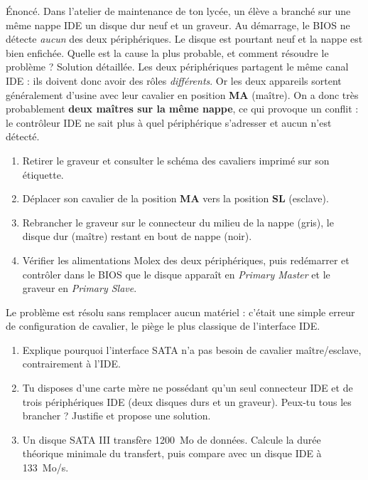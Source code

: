 \documentclass[11pt]{article}
\begin{document}
\begin{exoresolu}
Énoncé. Dans l'atelier de maintenance de ton lycée, un élève a branché sur une même nappe IDE un disque dur neuf et un graveur. Au démarrage, le BIOS ne détecte \emph{aucun} des deux périphériques. Le disque est pourtant neuf et la nappe est bien enfichée. Quelle est la cause la plus probable, et comment résoudre le problème ?
\tcblower
Solution détaillée. Les deux périphériques partagent le même canal IDE : ils doivent donc avoir des rôles \emph{différents}. Or les deux appareils sortent généralement d'usine avec leur cavalier en position \textbf{MA} (maître). On a donc très probablement \textbf{deux maîtres sur la même nappe}, ce qui provoque un conflit : le contrôleur IDE ne sait plus à quel périphérique s'adresser et aucun n'est détecté.
\begin{enumerate}
\item Retirer le graveur et consulter le schéma des cavaliers imprimé sur son étiquette.
\item Déplacer son cavalier de la position \textbf{MA} vers la position \textbf{SL} (esclave).
\item Rebrancher le graveur sur le connecteur du milieu de la nappe (gris), le disque dur (maître) restant en bout de nappe (noir).
\item Vérifier les alimentations Molex des deux périphériques, puis redémarrer et contrôler dans le BIOS que le disque apparaît en \emph{Primary Master} et le graveur en \emph{Primary Slave}.
\end{enumerate}
Le problème est résolu sans remplacer aucun matériel : c'était une simple erreur de configuration de cavalier, le piège le plus classique de l'interface IDE.
\end{exoresolu}

\begin{exercice}
\begin{enumerate}
\item Explique pourquoi l'interface SATA n'a pas besoin de cavalier maître/esclave, contrairement à l'IDE.
\item Tu disposes d'une carte mère ne possédant qu'un seul connecteur IDE et de trois périphériques IDE (deux disques durs et un graveur). Peux-tu tous les brancher ? Justifie et propose une solution.
\item Un disque SATA III transfère \SI{1200}{Mo} de données. Calcule la durée théorique minimale du transfert, puis compare avec un disque IDE à \SI{133}{Mo/s}.
\end{enumerate}
\end{exercice}
\end{document}
